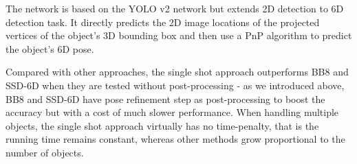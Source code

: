 The network is based on the YOLO v2 network but extends 2D detection to 6D detection task. It directly predicts the 2D image locations of the projected vertices of the object’s 3D bounding box and then use a PnP algorithm to predict the object’s 6D pose.

Compared with other approaches, the single shot approach outperforms BB8 \cite{rad2017bb8} and SSD-6D \cite{kehl2017ssd} when they are tested without post-processing - as we introduced above, BB8 and SSD-6D have pose refinement step as post-processing to boost the accuracy but with a cost of much slower performance. When handling multiple objects, the single shot approach virtually has no time-penalty, that is the running time remains constant, whereas other methods grow proportional to the number of objects.